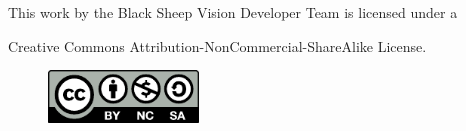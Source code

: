 
\thispagestyle{empty}

\null
\vfill

\centerline{This work by the Black Sheep Vision Developer Team is licensed under a}
\centerline{Creative Commons Attribution-NonCommercial-ShareAlike License.}

\begin{figure}[b]
  \centering
  \includegraphics[width=4cm]{images/misc/by-nc-sa.pdf}
\end{figure}
